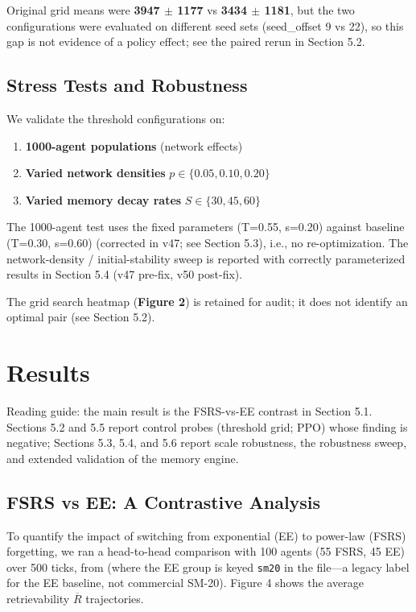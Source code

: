 \documentclass[11pt]{article}
\begin{document}
Original grid means were \textbf{3947 $\pm$ 1177} vs \textbf{3434 $\pm$ 1181}, but the two configurations were evaluated on different seed sets (seed\_offset 9 vs 22), so this gap is not evidence of a policy effect; see the paired rerun in Section 5.2.

\subsection{Stress Tests and Robustness}
We validate the threshold configurations on:

\begin{enumerate}
\item \textbf{1000-agent populations} (network effects)
\item \textbf{Varied network densities} $p \in \{0.05, 0.10, 0.20\}$
\item \textbf{Varied memory decay rates} $S \in \{30, 45, 60\}$
\end{enumerate}

The 1000-agent test uses the fixed parameters (T=0.55, s=0.20) against baseline (T=0.30, s=0.60) (corrected in v47; see Section 5.3), i.e., no re-optimization. The network-density / initial-stability sweep is reported with correctly parameterized results in Section 5.4 (v47 pre-fix, v50 post-fix).

The grid search heatmap (\textbf{Figure 2}) is retained for audit; it does not identify an optimal pair (see Section 5.2).

\section{Results}
Reading guide: the main result is the FSRS-vs-EE contrast in Section 5.1. Sections 5.2 and 5.5 report control probes (threshold grid; PPO) whose finding is negative; Sections 5.3, 5.4, and 5.6 report scale robustness, the robustness sweep, and extended validation of the memory engine.

\subsection{FSRS vs EE: A Contrastive Analysis}
To quantify the impact of switching from exponential (EE) to power-law (FSRS) forgetting, we ran a head-to-head comparison with 100 agents (55 FSRS, 45 EE) over 500 ticks, from  (where the EE group is keyed \texttt{sm20} in the file---a legacy label for the EE baseline, not commercial SM-20). Figure 4 shows the average retrievability $\overline{R}$ trajectories.
\end{document}
